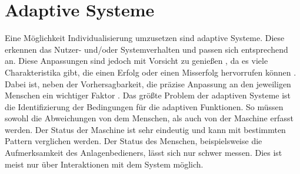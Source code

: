 \section{Adaptive Systeme}
\label{2:Adaptive-Systeme}
Eine Möglichkeit Individualisierung umzusetzen sind adaptive Systeme. Diese erkennen das Nutzer- und/oder Systemverhalten und passen sich entsprechend an. Diese Anpassungen sind jedoch mit Vorsicht zu genießen , da es viele Charakteristika gibt, die einen Erfolg oder einen Misserfolg hervorrufen können \cite{Gajos2008}. Dabei ist, neben der Vorhersagbarkeit, die präzise Anpassung an den jeweiligen Menschen ein wichtiger Faktor \cite{Gajos2008}. Das größte Problem der adaptiven Systeme ist die Identifizierung der Bedingungen für die adaptiven Funktionen. So müssen sowohl die Abweichungen von dem Menschen, als auch von der Maschine erfasst werden. Der Status der Maschine ist sehr eindeutig und kann mit bestimmten Pattern verglichen werden. Der Status des Menschen, beispielsweise die Aufmerksamkeit des Anlagenbedieners, lässt sich nur schwer messen. Dies ist meist nur über Interaktionen mit dem System möglich. \cite{Viano2000}

